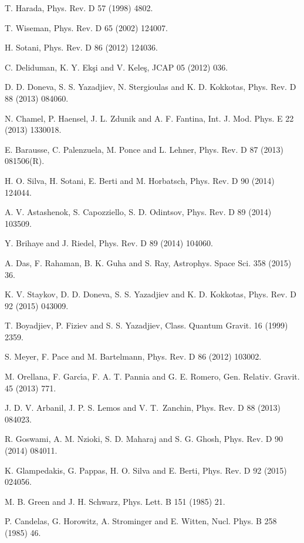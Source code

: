\documentclass[aps]{revtex4}
\begin{document}
\begin{thebibliography}{999}
 T. Harada, Phys. Rev. D 57 (1998) 4802.

 T. Wiseman, Phys. Rev. D 65 (2002) 124007.

 H. Sotani, Phys. Rev. D 86 (2012) 124036.

 C. Deliduman, K. Y. Ek\c{s}i and V. Kele\c{s}, JCAP 05
(2012) 036.

 D. D. Doneva, S. S. Yazadjiev, N. Stergioulas and K. D.
Kokkotas, Phys. Rev. D 88 (2013) 084060.

 N. Chamel, P. Haensel, J. L. Zdunik and A. F. Fantina,
Int. J. Mod. Phys. E 22 (2013) 1330018.

 E. Barausse, C. Palenzuela, M. Ponce and L. Lehner,
Phys. Rev. D 87 (2013) 081506(R).

 H. O. Silva, H. Sotani, E. Berti and M. Horbatsch, Phys.
Rev. D 90 (2014) 124044.

 A. V. Astashenok, S. Capozziello, S. D. Odintsov, Phys.
Rev. D 89 (2014) 103509.

 Y. Brihaye and J. Riedel, Phys. Rev. D 89 (2014) 104060.

 A. Das, F. Rahaman, B. K. Guha and S. Ray, Astrophys. Space
Sci. 358 (2015) 36.

 K. V. Staykov, D. D. Doneva, S. S. Yazadjiev and K. D.
Kokkotas, Phys. Rev. D 92 (2015) 043009.

 T. Boyadjiev, P. Fiziev and S. S. Yazadjiev, Class.
Quantum Gravit. 16 (1999) 2359.

 S. Meyer, F. Pace and M. Bartelmann, Phys. Rev. D 86 (2012)
103002.

 M. Orellana, F. Garc\'{\i}a, F. A. T. Pannia and G. E.
Romero, Gen. Relativ. Gravit. 45 (2013) 771.

 J. D. V. Arbanil, J. P. S. Lemos and V. T.\ Zanchin,
Phys. Rev. D 88 (2013) 084023.

 R. Goswami, A. M. Nzioki, S. D. Maharaj and S. G.
Ghosh, Phys. Rev. D 90 (2014) 084011.

 K. Glampedakis, G. Pappas, H. O. Silva and E.
Berti, Phys. Rev. D 92 (2015) 024056.

 M. B. Green and J. H. Schwarz, Phys. Lett. B 151 (1985) 21.

 P. Candelas, G. Horowitz, A. Strominger and E. Witten,
Nucl. Phys. B 258 (1985) 46.


\end{thebibliography}
\end{document}
